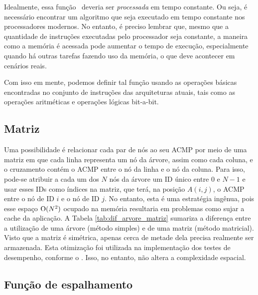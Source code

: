 Idealmente, essa função \ACMPIDs\ deveria ser \textit{processada} em tempo constante.
Ou seja, é necessário encontrar um algoritmo que seja executado em tempo constante nos processadores modernos.
No entanto, é preciso lembrar que, mesmo que a quantidade de instruções executadas pelo processador seja constante,
a maneira como a memória é acessada pode aumentar o tempo de execução, especialmente quando há outras tarefas fazendo uso da memória, o que deve acontecer em cenários reais.

Com isso em mente, podemos definir tal função usando as operações básicas encontradas no conjunto de instruções das arquiteturas atuais,
tais como as operações aritméticas e operações lógicas bit-a-bit.

\subsection{Matriz}

Uma possibilidade é relacionar cada par de nós ao seu ACMP por meio de uma matriz
em que cada linha representa um nó da árvore, assim como cada coluna, e o cruzamento contém o ACMP entre o nó da linha e o nó da coluna.
Para isso, pode-se atribuir a cada um dos $N$ nós da árvore um ID único entre $0$ e $N-1$ e usar esses IDs como índices na matriz,
que terá, na posição $A(i,j)$, o ACMP entre o nó de ID $i$ e o nó de ID $j$.
No entanto, esta é uma estratégia ingênua, pois esse espaço $\operatorname{O}(N^2)$ ocupado na memória resultaria em problemas como sujar a cache da aplicação.
A Tabela \ref{tab:dif_arvore_matriz} sumariza a diferença entre a utilização de uma árvore (método simples) e de uma matriz (método matricial).
Visto que a matriz é simétrica, apenas cerca de metade dela precisa realmente ser armazenada.
Esta otimização foi utilizada na implementação dos testes de desempenho, conforme o .
Isso, no entanto, não altera a complexidade espacial.





\subsection{Função de espalhamento}

